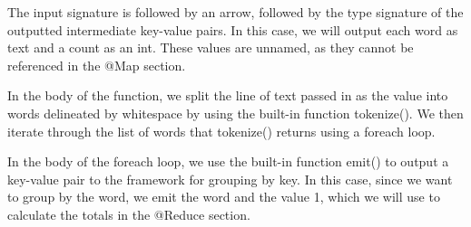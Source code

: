 \documentclass{article}
\begin{document}
The input signature is followed by an arrow, followed by the type signature of the outputted intermediate key-value pairs. In this case, we will output each word as text and a count as an int. These values are unnamed, as they cannot be referenced in the @Map section.

In the body of the function, we split the line of text passed in as the value into words delineated by whitespace by using the built-in function tokenize(). We then iterate through the list of words that tokenize() returns using a foreach loop. 

In the body of the foreach loop, we use the built-in function emit() to output a key-value pair to the framework for grouping by key. In this case, since we want to group by the word, we emit the word and the value 1, which we will use to calculate the totals in the @Reduce section.
\end{document}
